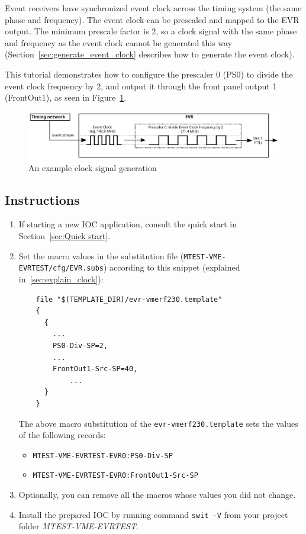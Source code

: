 \documentclass[12pt,a4paper]{article}
\begin{document}
Event receivers have synchronized event clock across the timing system (the same phase and frequency). The event clock can be prescaled and mapped to the EVR output. The minimum prescale factor is 2, so a clock signal with the same phase and frequency as the event clock cannot be generated this way (Section~\ref{sec:generate_event_clock} describes how to generate the event clock).

This tutorial demonstrates how to configure the prescaler 0 (PS0) to divide the event clock frequency by 2, and output it through the front panel output 1 (FrontOut1), as seen in Figure~\ref{fig:prescaler}. 

\begin{figure}[H]
	\centering
	\includegraphics[width=\columnwidth]{./img/prescaler}
	\caption{An example clock signal generation}
	\label{fig:prescaler}
\end{figure}

\subsection{Instructions}
\begin{enumerate}
	\item If starting a new IOC application, consult the quick start in Section~\ref{sec:Quick start}.

	\item Set the macro values in the substitution file (\texttt{MTEST-VME-EVRTEST/cfg/EVR.subs}) according to this snippet (explained in~\ref{sec:explain_clock}):
\begin{verbatim}
	file "$(TEMPLATE_DIR)/evr-vmerf230.template"
	{
	  {
	    ...
	    PS0-Div-SP=2,
	    ...
	    FrontOut1-Src-SP=40,
		    ...
	  }
	}
\end{verbatim}
	The above macro substitution of the \texttt{evr-vmerf230.template} sets the values of the following records:
	\begin{itemize}
		\item \texttt{MTEST-VME-EVRTEST-EVR0:PS0-Div-SP}
		\item \texttt{MTEST-VME-EVRTEST-EVR0:FrontOut1-Src-SP}
	\end{itemize}
	
	\item Optionally, you can remove all the macros whose values you did not change. 
	\item Install the prepared IOC by running command \texttt{swit -V} from your project folder \textit{MTEST-VME-EVRTEST}.
\end{enumerate}
\end{document}
